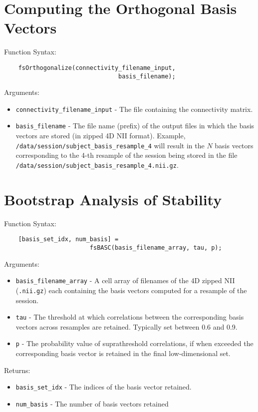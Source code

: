 \section{Computing the Orthogonal Basis Vectors}
Function Syntax:
\begin{verbatim}
    fsOrthogonalize(connectivity_filename_input,
                                basis_filename);
\end{verbatim}
Arguments:
\begin{itemize}
  \item \verb"connectivity_filename_input" -
    The file containing the connectivity matrix.
  \item \verb"basis_filename" - The file name (prefix) of
  the output files in which the basis vectors are stored (in zipped 4D NII
  format). Example, \verb"/data/session/subject_basis_resample_4"
  will result in the $N$ basis vectors   corresponding to the 4-th
  resample of the session being stored in the file
  \verb"/data/session/subject_basis_resample_4.nii.gz".
\end{itemize}


\section{Bootstrap Analysis of Stability}
\label{sec:basc}
 Function Syntax:
\begin{verbatim}
    [basis_set_idx, num_basis] =
                        fsBASC(basis_filename_array, tau, p);
\end{verbatim}
Arguments:
\begin{itemize}
  \item \verb"basis_filename_array" -
    A cell array of filenames of the 4D zipped NII (\verb".nii.gz")
    each containing the basis vectors computed for a resample of the
    session.
  \item \verb"tau" - The threshold at which correlations between the
  corresponding basis vectors across resamples are retained.
  Typically set between 0.6 and 0.9.
  \item \verb"p" - The probability value of suprathreshold correlations,
  if when exceeded the corresponding basis vector is retained in the
  final low-dimensional set.
\end{itemize}
Returns:
\begin{itemize}
  \item \verb"basis_set_idx" -
   The indices of the basis vector retained.
  \item \verb"num_basis" - The number of basis vectors retained
\end{itemize}

